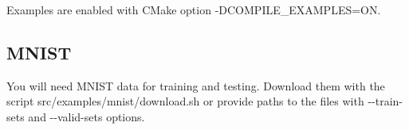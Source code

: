 Examples are enabled with C\+Make option {\ttfamily -\/\+D\+C\+O\+M\+P\+I\+L\+E\+\_\+\+E\+X\+A\+M\+P\+L\+ES=ON}.

\subsection*{M\+N\+I\+ST}

You will need M\+N\+I\+ST data for training and testing. Download them with the script {\ttfamily src/examples/mnist/download.\+sh} or provide paths to the files with {\ttfamily -\/-\/train-\/sets} and {\ttfamily -\/-\/valid-\/sets} options. 
